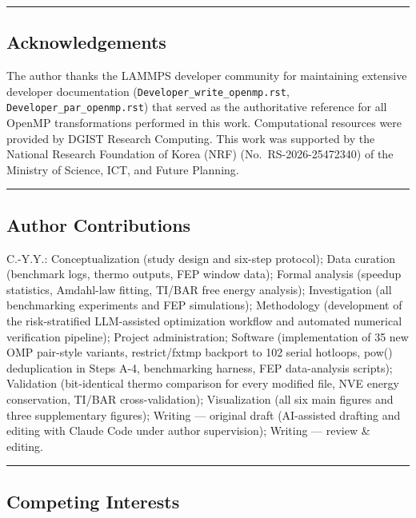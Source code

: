 \documentclass[
  11pt,
]{article}
\begin{document}
\begin{center}\rule{0.5\linewidth}{0.5pt}\end{center}

\subsection{Acknowledgements}\label{acknowledgements}

The author thanks the LAMMPS developer community for maintaining
extensive developer documentation
(\texttt{Developer\_write\_openmp.rst},
\texttt{Developer\_par\_openmp.rst}) that served as the authoritative
reference for all OpenMP transformations performed in this work.
Computational resources were provided by DGIST Research Computing. This
work was supported by the National Research Foundation of Korea (NRF)
(No.~RS-2026-25472340) of the Ministry of Science, ICT, and Future
Planning.

\begin{center}\rule{0.5\linewidth}{0.5pt}\end{center}

\subsection{Author Contributions}\label{author-contributions}

C.-Y.Y.: Conceptualization (study design and six-step protocol); Data
curation (benchmark logs, thermo outputs, FEP window data); Formal
analysis (speedup statistics, Amdahl-law fitting, TI/BAR free energy
analysis); Investigation (all benchmarking experiments and FEP
simulations); Methodology (development of the risk-stratified
LLM-assisted optimization workflow and automated numerical verification
pipeline); Project administration; Software (implementation of 35 new
OMP pair-style variants, restrict/fxtmp backport to 102 serial hotloops,
pow() deduplication in Steps A-4, benchmarking harness, FEP
data-analysis scripts); Validation (bit-identical thermo comparison for
every modified file, NVE energy conservation, TI/BAR cross-validation);
Visualization (all six main figures and three supplementary figures);
Writing --- original draft (AI-assisted drafting and editing with Claude
Code under author supervision); Writing --- review \& editing.

\begin{center}\rule{0.5\linewidth}{0.5pt}\end{center}

\subsection{Competing Interests}\label{competing-interests}
\end{document}
